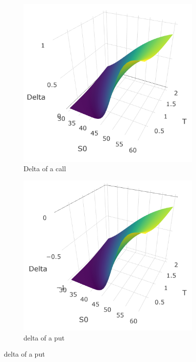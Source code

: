 \documentclass[hidelinks]{article}
\begin{document}
	
	\begin{figure}[!h]
	\centering
	\caption{Delta surfaces}
  \begin{subfigure}[b]{0.45\textwidth}
    \includegraphics[width=\textwidth]{delta_call.png}
    \caption{Delta of a call}
    \label{fig:delta_call}
  \end{subfigure}
  \begin{subfigure}[b]{0.45\textwidth}
    \includegraphics[width=\textwidth]{delta_put.png}
    \caption{delta of a put}
    \label{fig:delta_put}
  \end{subfigure}
\end{figure}
\end{document}

